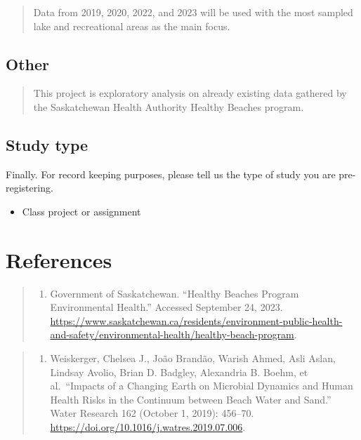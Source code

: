 \documentclass[]{article}
\providecommand{\tightlist}{%
\setlength{\itemsep}{0pt}\setlength{\parskip}{0pt}}
\begin{document}
\begin{quote}
Data from 2019, 2020, 2022, and 2023 will be used with the most sampled
lake and recreational areas as the main focus.
\end{quote}

\hypertarget{other}{%
\subsection{Other}\label{other}}

\begin{quote}
This project is exploratory analysis on already existing data gathered
by the Saskatchewan Health Authority Healthy Beaches program.
\end{quote}

\hypertarget{study-type}{%
\subsection{Study type}\label{study-type}}

Finally. For record keeping purposes, please tell us the type of study
you are pre-registering.

\begin{itemize}
\tightlist
\item
  Class project or assignment
\end{itemize}

\hypertarget{references}{%
\section{References}\label{references}}

\begin{quote}
\begin{enumerate}
\def\labelenumi{\arabic{enumi}.}
\tightlist
\item
  Government of Saskatchewan. ``Healthy Beaches Program \textbar{}
  Environmental Health.'' Accessed September 24, 2023.
  \url{https://www.saskatchewan.ca/residents/environment-public-health-and-safety/environmental-health/healthy-beach-program}.
\end{enumerate}
\end{quote}

\begin{quote}
\begin{enumerate}
\def\labelenumi{\arabic{enumi}.}
\setcounter{enumi}{1}
\tightlist
\item
  Weiskerger, Chelsea J., João Brandão, Warish Ahmed, Asli Aslan,
  Lindsay Avolio, Brian D. Badgley, Alexandria B. Boehm, et
  al.~``Impacts of a Changing Earth on Microbial Dynamics and Human
  Health Risks in the Continuum between Beach Water and Sand.'' Water
  Research 162 (October 1, 2019): 456--70.
  \url{https://doi.org/10.1016/j.watres.2019.07.006}.
\end{enumerate}
\end{quote}
\end{document}

